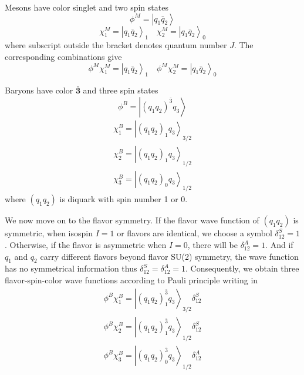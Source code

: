 \documentclass[prd,twocolumn,floatfix,nofootinbib]{revtex4}
\begin{document}
Mesons have color singlet and two spin states
\begin{equation}\label{colorM}
    \phi^{M}=\left| q_{1}\bar{q}_{2} \right\rangle
\end{equation}
\begin{equation}\label{spinM}
    \chi_{1}^{M}={\left| q_{1}\bar{q}_{2} \right\rangle}_{1} \quad \chi_{2}^{M}={\left| q_{1}\bar{q}_{2} \right\rangle}_{0}
\end{equation}
where subscript outside the bracket denotes quantum number $J$. The corresponding combinations give
\begin{equation}\label{colorspinM}
    \phi^{M}\chi_{1}^{M}={\left| q_{1}\bar{q}_{2} \right\rangle}_{1} \quad \phi^{M}\chi_{2}^{M}={\left| q_{1}\bar{q}_{2} \right\rangle}_{0}
\end{equation}

Baryons have color $\boldsymbol{\bar{3}}$ and three spin states
\begin{equation}\label{colorB}
    \phi^{B}=\left| {\left(q_{1}q_{2}\right)}^{\bar{3}} q_{3} \right\rangle
\end{equation}
\begin{equation}\label{spinB}
    \begin{aligned}
        \chi_{1}^{B}={\left| {\left(q_{1}q_{2}\right)}_{1} q_{3} \right\rangle}_{3/2} \\ 
        \chi_{2}^{B}={\left| {\left(q_{1}q_{2}\right)}_{1} q_{3} \right\rangle}_{1/2} \\
        \chi_{3}^{B}={\left| {\left(q_{1}q_{2}\right)}_{0} q_{3} \right\rangle}_{1/2}
    \end{aligned}
\end{equation}
where $\left(q_{1}q_{2}\right)$ is diquark with spin number 1 or 0.

We now move on to the flavor symmetry.
If the flavor wave function of $\left(q_{1}q_{2}\right)$ is symmetric, when isospin $I=1$ or flavors are identical, we choose a symbol $\delta_{12}^{S}=1$. 
Otherwise, if the flavor is asymmetric when $I=0$, there will be $\delta_{12}^{A}=1$. 
And if $q_{1}$ and $q_{2}$ carry different flavors beyond flavor SU(2) symmetry, the wave function has no symmetrical information thus $\delta_{12}^{S}=\delta_{12}^{A}=1$. 
Consequently, we obtain three flavor-spin-color wave functions according to Pauli principle writing in
\begin{equation}\label{colorspinB}
    \begin{aligned}
        \phi^{B}\chi_{1}^{B}={\left| {\left(q_{1}q_{2}\right)}_{1}^{\bar{3}} q_{3} \right\rangle}_{3/2} \delta_{12}^{S} \\
        \phi^{B}\chi_{2}^{B}={\left| {\left(q_{1}q_{2}\right)}_{1}^{\bar{3}} q_{3} \right\rangle}_{1/2} \delta_{12}^{S} \\
        \phi^{B}\chi_{3}^{B}={\left| {\left(q_{1}q_{2}\right)}_{0}^{\bar{3}} q_{3} \right\rangle}_{1/2} \delta_{12}^{A} 
    \end{aligned}
\end{equation}
\end{document}
